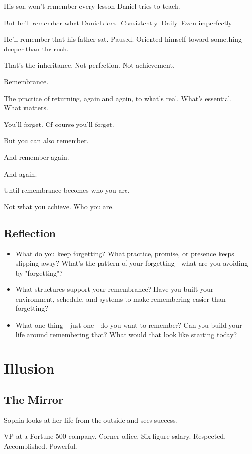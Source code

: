 \documentclass[11pt,twoside]{book}
\begin{document}
His son won't remember every lesson Daniel tries to teach.

But he'll remember what Daniel does. Consistently. Daily. Even imperfectly.

He'll remember that his father sat. Paused. Oriented himself toward something deeper than the rush.

That's the inheritance. Not perfection. Not achievement.

Remembrance.

The practice of returning, again and again, to what's real. What's essential. What matters.

You'll forget. Of course you'll forget.

But you can also remember.

And remember again.

And again.

Until remembrance becomes who you are.

Not what you achieve. Who you are.

\section*{Reflection}

\begin{itemize}
\item What do you keep forgetting? What practice, promise, or presence keeps slipping away? What's the pattern of your forgetting—what are you avoiding by "forgetting"?
\item What structures support your remembrance? Have you built your environment, schedule, and systems to make remembering easier than forgetting?
\item What one thing—just one—do you want to remember? Can you build your life around remembering that? What would that look like starting today?
\end{itemize}

\chapter{Illusion}

\section*{The Mirror}

Sophia looks at her life from the outside and sees success.

VP at a Fortune 500 company. Corner office. Six-figure salary. Respected. Accomplished. Powerful.
\end{document}
